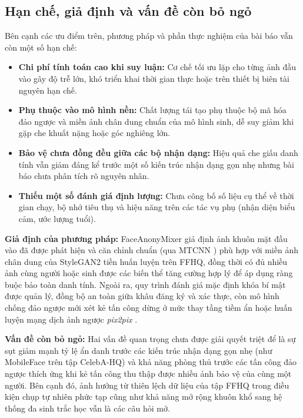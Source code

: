 \documentclass[oneside,a4paper,12pt]{extarticle}
\begin{document}
\subsection{Hạn chế, giả định và vấn đề còn bỏ ngỏ}
Bên cạnh các ưu điểm trên, phương pháp và phần thực nghiệm của bài báo vẫn còn một số hạn chế:
\begin{itemize}\setlength{\itemsep}{2pt}\setlength{\parskip}{0pt}
    \item \textbf{Chi phí tính toán cao khi suy luận:} Cơ chế tối ưu lặp cho từng ảnh đầu vào gây độ trễ lớn, khó triển khai thời gian thực hoặc trên thiết bị biên tài nguyên hạn chế.
    \item \textbf{Phụ thuộc vào mô hình nền:} Chất lượng tái tạo phụ thuộc bộ mã hóa đảo ngược và miền ảnh chân dung chuẩn của mô hình sinh, dễ suy giảm khi gặp che khuất nặng hoặc góc nghiêng lớn.
    \item \textbf{Bảo vệ chưa đồng đều giữa các bộ nhận dạng:} Hiệu quả che giấu danh tính vẫn giảm đáng kể trước một số kiến trúc nhận dạng gọn nhẹ nhưng bài báo chưa phân tích rõ nguyên nhân.
    \item \textbf{Thiếu một số đánh giá định lượng:} Chưa công bố số liệu cụ thể về thời gian chạy, bộ nhớ tiêu thụ và hiệu năng trên các tác vụ phụ (nhận diện biểu cảm, ước lượng tuổi).
\end{itemize}

\par\medskip\noindent\textbf{Giả định của phương pháp:} FaceAnonyMixer \cite{alam2025} giả định ảnh khuôn mặt đầu vào đã được phát hiện và căn chỉnh chuẩn (qua MTCNN \cite{zhang2016mtcnn}) phù hợp với miền ảnh chân dung của StyleGAN2 tiền huấn luyện trên FFHQ, đồng thời có đủ nhiều ảnh cùng người hoặc sinh được các biến thể tăng cường hợp lý để áp dụng ràng buộc bảo toàn danh tính. Ngoài ra, quy trình đánh giá mặc định khóa bí mật được quản lý, đồng bộ an toàn giữa khâu đăng ký và xác thực, còn mô hình chống đảo ngược mới xét kẻ tấn công dừng ở mức thay tầng tiềm ẩn hoặc huấn luyện mạng dịch ảnh ngược \textit{pix2pix} \cite{isola2017pix2pix}.

\par\smallskip\noindent\textbf{Vấn đề còn bỏ ngỏ:} Hai vấn đề quan trọng chưa được giải quyết triệt để là sự sụt giảm mạnh tỷ lệ ẩn danh trước các kiến trúc nhận dạng gọn nhẹ (như MobileFace trên tập CelebA-HQ) và khả năng phòng thủ trước các tấn công đảo ngược thích ứng khi kẻ tấn công thu thập được nhiều ảnh bảo vệ của cùng một người. Bên cạnh đó, ảnh hưởng từ thiên lệch dữ liệu của tập FFHQ trong điều kiện chụp tự nhiên phức tạp cũng như khả năng mở rộng khuôn khổ sang hệ thống đa sinh trắc học vẫn là các câu hỏi mở.
\end{document}
